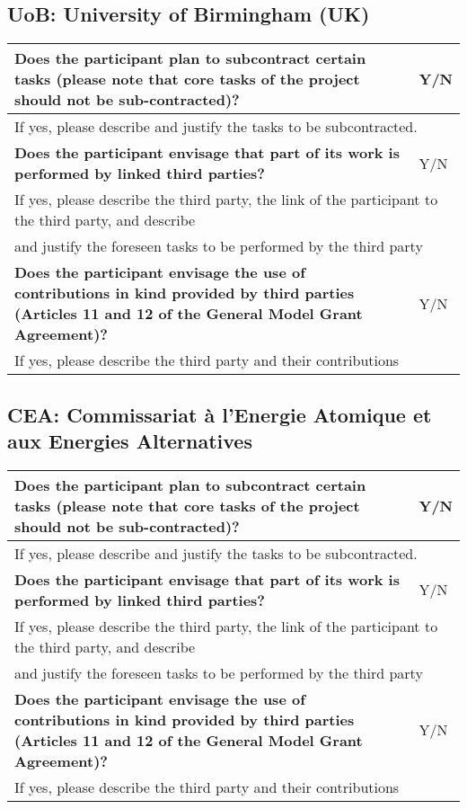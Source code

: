 \subsection{UoB: University of Birmingham (UK)}

\begin{longtable}{|p{}|p{}|}
\hline
{\bf Does the participant plan to subcontract certain tasks (please
  note that core tasks of the project should not be sub-contracted)?}
&
Y/N
\\
\hline
\multicolumn{2}{|l|}{
If yes, please describe and justify the tasks to be subcontracted.}
\\
\hline
{\bf Does the participant envisage that  part of its work is performed
  by linked third parties?}
&
Y/N
\\
\hline
\multicolumn{2}{|l|}{If yes, please describe the third party, the link of the
  participant to the third party, and describe}\\
\multicolumn{2}{|l|}{and justify the foreseen
tasks to be performed by the third party}
\\
\hline
{\bf Does the participant envisage the use of contributions in kind
provided by third parties (Articles 11 and 12 of the General Model
Grant Agreement)?}
&
Y/N
\\
\hline
\multicolumn{2}{|l|}{If yes, please describe the third party and their contributions}
\\
\hline
\end{longtable}


\subsection{CEA: Commissariat à l’Energie Atomique et aux Energies
  Alternatives}
\begin{longtable}{|p{}|p{}|}
\hline
{\bf Does the participant plan to subcontract certain tasks (please
  note that core tasks of the project should not be sub-contracted)?}
&
Y/N
\\
\hline
\multicolumn{2}{|l|}{
If yes, please describe and justify the tasks to be subcontracted.}
\\
\hline
{\bf Does the participant envisage that  part of its work is performed
  by linked third parties?}
&
Y/N
\\
\hline
\multicolumn{2}{|l|}{If yes, please describe the third party, the link of the
  participant to the third party, and describe}\\
\multicolumn{2}{|l|}{and justify the foreseen
tasks to be performed by the third party}
\\
\hline
{\bf Does the participant envisage the use of contributions in kind
provided by third parties (Articles 11 and 12 of the General Model
Grant Agreement)?}
&
Y/N
\\
\hline
\multicolumn{2}{|l|}{If yes, please describe the third party and their contributions}
\\
\hline
\end{longtable}



